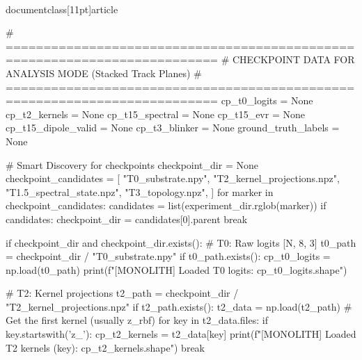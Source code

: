 \\documentclass[11pt]{article}
\begin{document}
\begin{CodeBlock}
    # ==========================================================================
    # CHECKPOINT DATA FOR ANALYSIS MODE (Stacked Track Planes)
    # ==========================================================================
    cp_t0_logits = None
    cp_t2_kernels = None
    cp_t15_spectral = None
    cp_t15_evr = None
    cp_t15_dipole_valid = None
    cp_t3_blinker = None
    ground_truth_labels = None

    # Smart Discovery for checkpoints
    checkpoint_dir = None
    checkpoint_candidates = [
        "T0_substrate.npy",
        "T2_kernel_projections.npz",
        "T1.5_spectral_state.npz",
        "T3_topology.npz",
    ]
    for marker in checkpoint_candidates:
        candidates = list(experiment_dir.rglob(marker))
        if candidates:
            checkpoint_dir = candidates[0].parent
            break

    if checkpoint_dir and checkpoint_dir.exists():
        # T0: Raw logits [N, 8, 3]
        t0_path = checkpoint_dir / "T0_substrate.npy"
        if t0_path.exists():
            cp_t0_logits = np.load(t0_path)
            print(f"[MONOLITH] Loaded T0 logits: {cp_t0_logits.shape}")

        # T2: Kernel projections
        t2_path = checkpoint_dir / "T2_kernel_projections.npz"
        if t2_path.exists():
            t2_data = np.load(t2_path)
            # Get the first kernel (usually z_rbf)
            for key in t2_data.files:
                if key.startswith('z_'):
                    cp_t2_kernels = t2_data[key]
                    print(f"[MONOLITH] Loaded T2 kernels ({key}): {cp_t2_kernels.shape}")
                    break


\end{CodeBlock}
\end{document}
